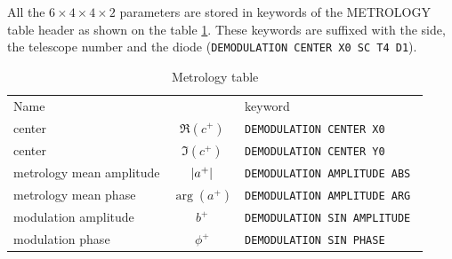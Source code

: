 \documentclass[a4paper,11pt,twoside]{scrartcl}
\begin{document}
All the $6\times4\times4\times2$ parameters are stored in keywords of the METROLOGY table header as shown on the table \ref{tab:keyword}. These keywords are suffixed with the side, the telescope number and the diode (\eg \verb|DEMODULATION CENTER X0 SC T4 D1|).
\begin{table}[]
    \centering
    \begin{tabular}{l c l}
Name   &          & keyword   \\
center    &      $\Re(c^+)$        &   \verb|DEMODULATION CENTER X0|   \\
center   &      $\Im(c^+) $       &   \verb|DEMODULATION CENTER Y0|   \\
metrology mean amplitude  &      $\left\vert a^+\right\vert $       &   \verb|DEMODULATION AMPLITUDE ABS|   \\
metrology mean phase  &      $\arg{(a^+)} $       &   \verb|DEMODULATION AMPLITUDE ARG|   \\
modulation amplitude  &      $b^+ $       &   \verb|DEMODULATION SIN AMPLITUDE |   \\
modulation phase  &      $\phi^+ $       &   \verb|DEMODULATION SIN PHASE|   
    \end{tabular}
    \caption{Metrology table}
    \label{tab:keyword}
\end{table}
\end{document}
